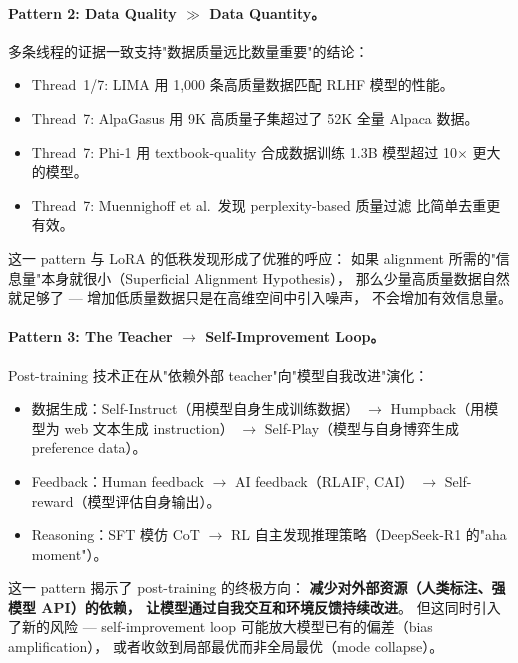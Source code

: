 \paragraph{Pattern 2: Data Quality $\gg$ Data Quantity。}
多条线程的证据一致支持"数据质量远比数量重要"的结论：
\begin{itemize}[leftmargin=2em]
  \item Thread~1/7: LIMA 用 1,000 条高质量数据匹配 RLHF 模型的性能。
  \item Thread~7: AlpaGasus 用 9K 高质量子集超过了 52K 全量 Alpaca 数据。
  \item Thread~7: Phi-1 用 textbook-quality 合成数据训练 1.3B 模型超过
    10$\times$ 更大的模型。
  \item Thread~7: Muennighoff et al.\ 发现 perplexity-based 质量过滤
    比简单去重更有效。
\end{itemize}
这一 pattern 与 LoRA 的低秩发现形成了优雅的呼应：
如果 alignment 所需的"信息量"本身就很小（Superficial Alignment Hypothesis），
那么少量高质量数据自然就足够了 ---
增加低质量数据只是在高维空间中引入噪声，
不会增加有效信息量。

\paragraph{Pattern 3: The Teacher $\rightarrow$ Self-Improvement Loop。}
Post-training 技术正在从"依赖外部 teacher"向"模型自我改进"演化：
\begin{itemize}[leftmargin=2em]
  \item 数据生成：Self-Instruct（用模型自身生成训练数据）
    $\rightarrow$ Humpback（用模型为 web 文本生成 instruction）
    $\rightarrow$ Self-Play（模型与自身博弈生成 preference data）。
  \item Feedback：Human feedback $\rightarrow$ AI feedback（RLAIF, CAI）
    $\rightarrow$ Self-reward（模型评估自身输出）。
  \item Reasoning：SFT 模仿 CoT $\rightarrow$
    RL 自主发现推理策略（DeepSeek-R1 的"aha moment"）。
\end{itemize}
这一 pattern 揭示了 post-training 的终极方向：
\textbf{减少对外部资源（人类标注、强模型 API）的依赖，
让模型通过自我交互和环境反馈持续改进}。
但这同时引入了新的风险 ---
self-improvement loop 可能放大模型已有的偏差（bias amplification），
或者收敛到局部最优而非全局最优（mode collapse）。

